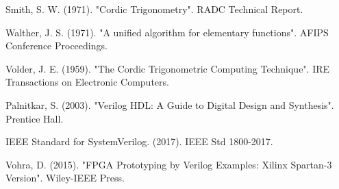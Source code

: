 \documentclass[12pt,a4paper, twoside]{article} %
\begin{document}
\begin{thebibliography}{6}
Smith, S. W. (1971). "Cordic Trigonometry". RADC Technical Report.

Walther, J. S. (1971). "A unified algorithm for elementary functions". AFIPS Conference Proceedings.

Volder, J. E. (1959). "The Cordic Trigonometric Computing Technique". IRE Transactions on Electronic Computers.

Palnitkar, S. (2003). "Verilog HDL: A Guide to Digital Design and Synthesis". Prentice Hall.

IEEE Standard for SystemVerilog. (2017). IEEE Std 1800-2017.

Vohra, D. (2015). "FPGA Prototyping by Verilog Examples: Xilinx Spartan-3 Version". Wiley-IEEE Press.

\end{thebibliography}
\end{document}
